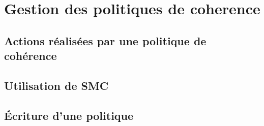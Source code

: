 \section{Gestion des politiques de coherence}

\subsection{Actions réalisées par une politique de cohérence}

\subsection{Utilisation de SMC}

\subsection{\'Ecriture d'une politique}


